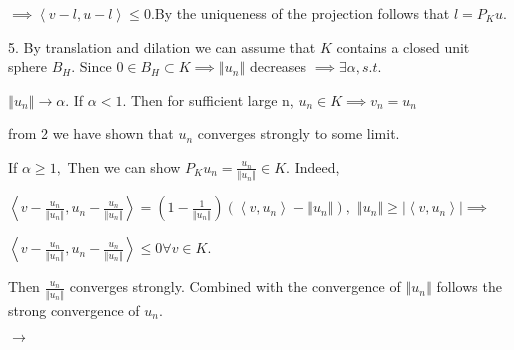 \documentclass{article}
\begin{document}
$\implies $\bigskip $\left\langle v-l,u-l\right\rangle \leq 0.$By the
uniqueness of the projection follows that $l=P_{K}u.$

5. By translation and dilation we can assume that $K$ contains a closed unit
sphere $B_{H}.$ Since $0\in B_{H}\subset K\implies \left\Vert
u_{n}\right\Vert $ decreases $\implies \exists \alpha ,s.t.$

$\left\Vert u_{n}\right\Vert \rightarrow \alpha .$ If $\alpha <1.$ Then for
sufficient large n, $u_{n}\in K\implies v_{n}=u_{n}$

from 2 we have shown that $u_{n}$ converges strongly to some limit.

If $\alpha \geq 1,$ Then we can show $P_{K}u_{n}=\frac{u_{n}}{\left\Vert
u_{n}\right\Vert }\in K.$ Indeed,

$\left\langle v-\frac{u_{n}}{\left\Vert u_{n}\right\Vert },u_{n}-\frac{u_{n}%
}{\left\Vert u_{n}\right\Vert }\right\rangle =\left( 1-\frac{1}{\left\Vert
u_{n}\right\Vert }\right) \left( \left\langle v,u_{n}\right\rangle
-\left\Vert u_{n}\right\Vert \right) ,$ $\left\Vert u_{n}\right\Vert \geq
\left\vert \left\langle v,u_{n}\right\rangle \right\vert \implies $

$\left\langle v-\frac{u_{n}}{\left\Vert u_{n}\right\Vert },u_{n}-\frac{u_{n}%
}{\left\Vert u_{n}\right\Vert }\right\rangle \leq 0\forall v\in K.$

Then $\frac{u_{n}}{\left\Vert u_{n}\right\Vert }$ converges strongly.
Combined with the convergence of $\left\Vert u_{n}\right\Vert $ follows the
strong convergence of $u_{n}.$

$\rightarrow $
\end{document}
